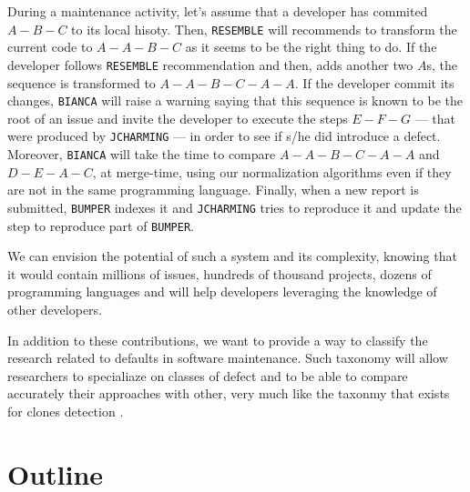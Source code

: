 During a maintenance activity, let's assume that a developer has commited $A-B-C$ to its local hisoty.
Then, {\tt RESEMBLE} will recommends to transform the current code to $A-A-B-C$ as it seems to be the right thing to do.
If the developer follows {\tt RESEMBLE} recommendation and then, adds another two $A$s, the sequence is transformed to $A-A-B-C-A-A$.
If the developer commit its changes, {\tt BIANCA} will raise a warning saying that this sequence is known to be the root of an issue and invite the developer to execute the steps $E-F-G$ --- that were produced by {\tt JCHARMING} --- in order to see if s/he did introduce a defect.
Moreover, {\tt BIANCA} will take the time to compare $A-A-B-C-A-A$ and $D-E-A-C$, at merge-time, using our normalization algorithms even if they are not in the same programming language.
Finally, when a new report is submitted, {\tt BUMPER} indexes it and {\tt JCHARMING} tries to reproduce it and update the step to reproduce part of {\tt BUMPER}.

We can envision the potential of such a system and its complexity, knowing that it would contain millions of issues, hundreds of thousand projects, dozens of programming languages and will help developers leveraging the knowledge of other developers.

In addition to these contributions, we want to provide a way to classify the research related to defaults in software maintenance.
Such taxonomy will allow researchers to specialiaze on classes of defect and to be able to compare accurately their approaches with other, very much like the taxonmy that exists for clones detection \cite{CoryKapser}.


\section{Outline\label{sec:outline}}
